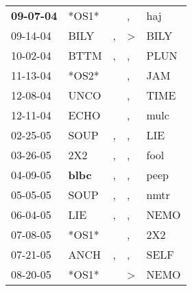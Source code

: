 \begin{supertabular}{p{0.07\textwidth}p{0.06\textwidth}p{0.02\textwidth}p{0.02\textwidth}p{0.06\textwidth}}
 \textbf{09-07-04\textsuperscript{}} &                            *OS1* &                  &                , &            haj\textsuperscript{} \\
          09-14-04\textsuperscript{} &           BILY\textsuperscript{} &                , &     \textgreater &           BILY\textsuperscript{} \\
          10-02-04\textsuperscript{} &           BTTM\textsuperscript{} &                , &                , &           PLUN\textsuperscript{} \\
          11-13-04\textsuperscript{} &                            *OS2* &                  &                , &            JAM\textsuperscript{} \\
          12-08-04\textsuperscript{} &           UNCO\textsuperscript{} &                  &                , &           TIME\textsuperscript{} \\
          12-11-04\textsuperscript{} &           ECHO\textsuperscript{} &                  &                , &           mulc\textsuperscript{} \\
          02-25-05\textsuperscript{} &           SOUP\textsuperscript{} &                , &                , &            LIE\textsuperscript{} \\
          03-26-05\textsuperscript{} &            2X2\textsuperscript{} &                , &                , &           fool\textsuperscript{} \\
          04-09-05\textsuperscript{} &  \textbf{blbc\textsuperscript{}} &                , &                , &           peep\textsuperscript{} \\
          05-05-05\textsuperscript{} &           SOUP\textsuperscript{} &                , &                , &           nmtr\textsuperscript{} \\
          06-04-05\textsuperscript{} &            LIE\textsuperscript{} &                , &                , &           NEMO\textsuperscript{} \\
          07-08-05\textsuperscript{} &                            *OS1* &                  &                , &            2X2\textsuperscript{} \\
          07-21-05\textsuperscript{} &           ANCH\textsuperscript{} &                , &                , &           SELF\textsuperscript{} \\
          08-20-05\textsuperscript{} &                            *OS1* &                  &     \textgreater &           NEMO\textsuperscript{} \\

\end{supertabular}
